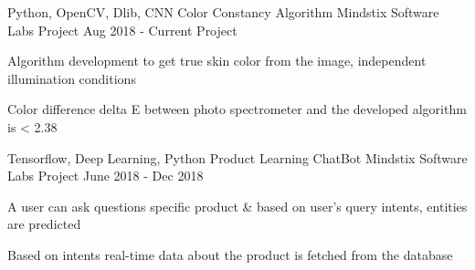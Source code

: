 

\begin{cventries}


  \cventry
    {Python, OpenCV, Dlib, CNN} %
    {Color Constancy Algorithm} %
    {Mindstix Software Labs Project} %
    {Aug 2018 - Current Project} %
    {
      \begin{cvitems} %
        \item {Algorithm development to get true skin color from the image, independent illumination conditions}
        \item {Color difference delta E between photo spectrometer and the developed algorithm is < 2.38}
      \end{cvitems}
    }

   \cventry
    {Tensorflow, Deep Learning, Python} %
    {Product Learning ChatBot} %
    {Mindstix Software Labs Project} %
    {June 2018 - Dec 2018} %
    {
      \begin{cvitems} %
        \item {A user can ask questions specific product \& based on user's query intents, entities are predicted}
        \item {Based on intents real-time data about the product is fetched from the database}
      \end{cvitems}
    }
  

\end{cventries}
